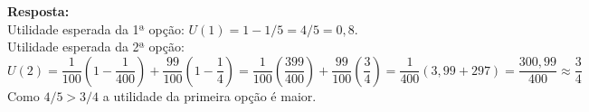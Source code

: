 \begin{enumerate}
\textbf{Resposta:}\\

Utilidade esperada da 1ª opção: {$ U(1) = 1 - 1/5 = 4/5 = 0,8.$}\\

Utilidade esperada da 2ª opção: {$ U(2) = \dfrac{1}{100} \left( 1 - \dfrac{1}{400} \right) + \dfrac{99}{100} \left( 1 - \dfrac{1}{4} \right) = \dfrac{1}{100} \left(\dfrac{399}{400} \right) + \dfrac{99}{100} \left(\dfrac{3}{4} \right) = \dfrac{1}{400} (3,99 + 297) = \dfrac{300,99}{400} \approx \dfrac{3}{4}$}\\

Como {$4/5 > 3/4$} a utilidade da primeira opção é maior.


\end{enumerate}

